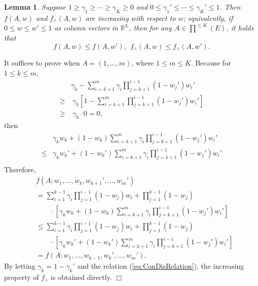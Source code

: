 \documentclass{article}
\newcommand{\RR}{\mathbb{R}}
\newtheorem{lemma}[theorem]{Lemma}%
\newenvironment{proof}{\noindent {\textbf{Proof. }}}{$\Box$ \medskip}
\begin{document}
\begin{lemma}
\label{lem:increasing} 
Suppose $1 \geq \gamma_1 \geq \cdots \geq \gamma_K \geq 0$ and $0 \leq \gamma_1' \leq \cdots \leq \gamma_K' \leq 1$. Then $f(A, w)$ and $f_{\wedge}(A, w)$ are increasing with respect to $w$; equivalently, if $0 \leq w \leq w' \leq 1$ as column vectors in $\RR^L$, then for any $A \in \prod^{\leq K}(E)$, it holds that
$$
f(A, w) \leq f(A, w'), ~~ f_{\wedge}(A, w) \leq f_{\wedge}(A, w').
$$
\end{lemma}
\begin{proof}
It suffices to prove when $A = (1, \ldots, m)$, where $1 \leq m \leq K$. Because for $1 \leq k \leq m$,
\begin{align*}
&\gamma_{k} - \sum_{i=k+1}^m \gamma_i \prod_{j = k + 1}^{i - 1} (1 - w_j') w_i'\\
\geq &~\gamma_k [1 - \sum_{i=k+1}^m \prod_{j=k+1}^{i-1}(1 - w_j') w_i']\\
\geq &~\gamma_{k} \cdot 0 = 0,
\end{align*}
then
\begin{align*}
&\gamma_k w_k + (1 - w_k)\sum_{i=k+1}^m \gamma_i \prod_{j=k+1}^{i-1}(1 - w_j') w_i'\\
\leq &\gamma_k w_k' + (1 - w_k')\sum_{i=k+1}^m \gamma_i \prod_{j=k+1}^{i-1}(1 - w_j') w_i'\\
\end{align*}
Therefore, 
\begin{align*}
& f(A; w_1, \dots, w_k, w_{k+1}', \dots, w_m')\\
&=\sum_{i=1}^{k-1} \gamma_i \prod_{j=1}^{i-1}(1 - w_j) w_i + \prod_{j=1}^{k-1}(1 - w_j) \\
&\qquad \cdot [\gamma_k w_k + (1 - w_k)\sum_{i=k+1}^m \gamma_i \prod_{j=k+1}^{i-1}(1 - w_j') w_i']\\
&\leq \sum_{i=1}^{k-1} \gamma_i \prod_{j=1}^{i-1}(1 - w_j) w_i + \prod_{j=1}^{k-1}(1 - w_j) \\
&\qquad \cdot [\gamma_k w_k' + (1 - w_k')\sum_{i=k+1}^m \gamma_i \prod_{j=k+1}^{i-1}(1 - w_j') w_i']\\
&=f(A; w_1, \ldots, w_{k-1}, w_{k}', \ldots, w_m').
\end{align*}
By letting $\gamma_k = 1 - \gamma_k'$ and the relation (\ref{eq:ConDisRelation}), the increasing property of $f_{\wedge}$ is obtained directly.
\end{proof}
\end{document}
